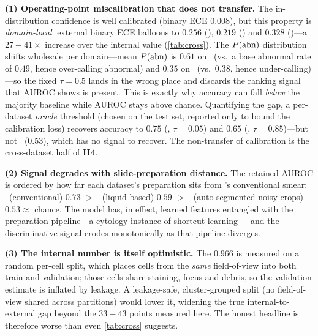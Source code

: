 \noindent\textbf{(1) Operating-point miscalibration that does not transfer.} The in-distribution
confidence is well calibrated (binary ECE $0.008$), but this property is \emph{domain-local}: external
binary ECE balloons to $0.256$ (\herlev), $0.219$ (\hicervix) and $0.328$ (\apacc)---a
$27\!-\!41\times$ increase over the internal value (\cref{tab:cross}). The $P(\mathrm{abn})$ distribution shifts
wholesale per domain---mean $P(\mathrm{abn})$ is $0.61$ on \apacc\ (vs.\ a base abnormal rate of $0.49$, hence
over-calling abnormal) and $0.35$ on \hicervix\ (vs.\ $0.38$, hence under-calling)---so the fixed
$\tau{=}0.5$ lands in the wrong place and discards the ranking signal that AUROC shows is present.
This is exactly why accuracy can fall \emph{below} the majority baseline while AUROC stays above
chance. Quantifying the gap, a per-dataset \emph{oracle} threshold (chosen on the test set, reported
only to bound the calibration loss) recovers accuracy to $0.75$ (\herlev, $\tau{=}0.05$) and $0.65$
(\hicervix, $\tau{=}0.85$)---but not \apacc\ ($0.53$), which has no signal to recover. The
non-transfer of calibration is the cross-dataset half of \textbf{H4}.

\noindent\textbf{(2) Signal degrades with slide-preparation distance.} The retained AUROC is ordered
by how far each dataset's preparation sits from \sipakmed's conventional smear:
\herlev\ (conventional) $0.73$ $>$ \hicervix\ (liquid-based) $0.59$ $>$ \apacc\ (auto-segmented noisy
crops) $0.53\!\approx\!$ chance. The model has, in effect, learned features entangled with the
preparation pipeline---a cytology instance of shortcut learning~\cite{geirhos2020shortcut}---and the
discriminative signal erodes monotonically as that pipeline diverges.

\noindent\textbf{(3) The internal number is itself optimistic.} The $0.966$ is measured on a random
per-cell split, which places cells from the \emph{same} field-of-view into both train and validation;
those cells share staining, focus and debris, so the validation estimate is inflated by leakage. A
leakage-safe, cluster-grouped split (no field-of-view shared across partitions) would lower it,
widening the true internal-to-external gap beyond the $33\!-\!43$ points measured here. The honest
headline is therefore worse than even \cref{tab:cross} suggests.
